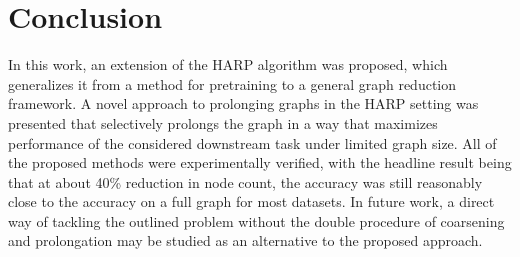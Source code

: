 \section{Conclusion}

In this work, an extension of the HARP algorithm was proposed, which generalizes it from a method for pretraining to a general graph reduction framework. A novel approach to prolonging graphs in the HARP setting was presented that selectively prolongs the graph in a way that maximizes performance of the considered downstream task under limited graph size. All of the proposed methods were experimentally verified, with the headline result being that at about 40\% reduction in node count, the accuracy was still reasonably close to the accuracy on a full graph for most datasets. In future work, a direct way of tackling the outlined problem without the double procedure of coarsening and prolongation may be studied as an alternative to the proposed approach.
